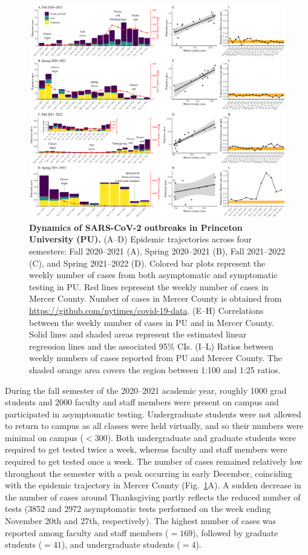 \documentclass[12pt]{article}
\newcommand{\fref}[1]{Fig.~\ref{fig:#1}}
\begin{document}
\begin{figure}[!th]
\includegraphics[width=\textwidth]{../figure_princeton_new/figure_princeton_new.pdf}
\caption{
\textbf{Dynamics of SARS-CoV-2 outbreaks in Princeton University (PU).}
(A--D) Epidemic trajectories across four semesters: Fall 2020--2021 (A), Spring 2020--2021 (B), Fall 2021--2022 (C), and Spring 2021--2022 (D).
Colored bar plots represent the weekly number of cases from both asymptomatic and symptomatic testing in PU.
Red lines represent the weekly number of cases in Mercer County.
Number of cases in Mercer County is obtained from \url{https://github.com/nytimes/covid-19-data}.
(E--H) Correlations between the weekly number of cases in PU and in Mercer County.
Solid lines and shaded areas represent the estimated linear regression lines and the associated 95\% CIs.
(I--L) Ratios between weekly numbers of cases reported from PU and Mercer County.
The shaded orange area covers the region between 1:100 and 1:25 ratios.
\label{fig:princeton}
}
\end{figure}

During the fall semester of the 2020--2021 academic year, roughly 1000 grad students and 2000 faculty and staff members were present on campus and participated in asymptomatic testing. 
Undergraduate students were not allowed to return to campus as all classes were held virtually, and so their numbers were minimal on campus ($<300$).  
Both undergraduate and graduate students were required to get tested twice a week, whereas faculty and staff members were required to get tested once a week.
The number of cases remained relatively low throughout the semester with a peak occurring in early December, coinciding with the epidemic trajectory in Mercer County (\fref{princeton}A).  
A sudden decrease in the number of cases around Thanksgiving partly reflects the reduced number of tests (3852 and 2972 asymptomatic tests performed on the week ending November 20th and 27th, respectively).
The highest number of cases was reported among faculty and staff members ($=169$), followed by graduate students ($=41$), and undergraduate students ($=4$).
\end{document}
